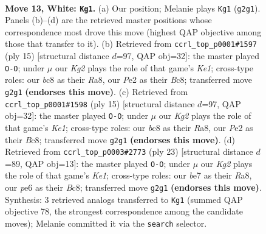 \documentclass[11pt]{article}
\begin{document}
\clearpage

\begin{figure}[p]\centering
\begin{subfigure}{0.46\textwidth}\centering
\resizebox{\linewidth}{!}{%
\newchessgame
\chessboard[
  setfen={rnbqr1k1/p3bp1p/2p1p1p1/1p1n4/3P4/3Q1BP1/PP1NPPKP/RNB2R2 w - - 0 13},
  showmover=false,
  pgfstyle=straightmove, color=movearrow, markmove={g2-g1}
]}
\caption{}
\end{subfigure}\hfill
\begin{subfigure}{0.46\textwidth}\centering
\resizebox{\linewidth}{!}{%
\newchessgame
\chessboard[
  setfen={r1bqk2r/ppp1npbp/2np2p1/8/2PNP3/2N1B1P1/PP3P1P/R2QKB1R b KQkq - 2 8},
  showmover=false,
  pgfstyle=straightmove, color=movearrow, markmove={e8-g8}
]}
\caption{}
\end{subfigure}
\\[4pt]
\begin{subfigure}{0.46\textwidth}\centering
\resizebox{\linewidth}{!}{%
\newchessgame
\chessboard[
  setfen={r1bqk2r/ppp1npbp/2np2p1/8/2PNP3/2N1B1P1/PP3P1P/R2QKB1R b KQkq - 2 8},
  showmover=false,
  pgfstyle=straightmove, color=movearrow, markmove={e8-g8}
]}
\caption{}
\end{subfigure}\hfill
\begin{subfigure}{0.46\textwidth}\centering
\resizebox{\linewidth}{!}{%
\newchessgame
\chessboard[
  setfen={r1bqk2r/1p2nppp/2pp2n1/p1b5/P2NP3/2P1B3/1P2BPPP/RN1QR1K1 b kq - 3 12},
  showmover=false,
  pgfstyle=straightmove, color=movearrow, markmove={e8-g8}
]}
\caption{}
\end{subfigure}
\caption{\textbf{Move 13, White: \texttt{Kg1}.} (a) Our position; Melanie plays \texttt{Kg1} (\texttt{g2g1}). Panels (b)--(d) are the retrieved master positions whose correspondence most drove this move (highest QAP objective among those that transfer to it). (b) Retrieved from \texttt{ccrl\_top\_p0001\#1597} (ply 15) [structural distance $d$=97, QAP obj=32]: the master played \texttt{O-O}; under $\mu$ our \emph{Kg2} plays the role of that game's \emph{Ke1}; cross-type roles: our \emph{b}c8 as their \emph{R}a8, our \emph{P}e2 as their \emph{B}c8; transferred move \texttt{g2g1} \textbf{(endorses this move)}. (c) Retrieved from \texttt{ccrl\_top\_p0001\#1598} (ply 15) [structural distance $d$=97, QAP obj=32]: the master played \texttt{O-O}; under $\mu$ our \emph{Kg2} plays the role of that game's \emph{Ke1}; cross-type roles: our \emph{b}c8 as their \emph{R}a8, our \emph{P}e2 as their \emph{B}c8; transferred move \texttt{g2g1} \textbf{(endorses this move)}. (d) Retrieved from \texttt{ccrl\_top\_p0003\#2773} (ply 23) [structural distance $d$=89, QAP obj=13]: the master played \texttt{O-O}; under $\mu$ our \emph{Kg2} plays the role of that game's \emph{Ke1}; cross-type roles: our \emph{b}e7 as their \emph{R}a8, our \emph{p}e6 as their \emph{B}c8; transferred move \texttt{g2g1} \textbf{(endorses this move)}. Synthesis: 3 retrieved analogs transferred to \texttt{Kg1} (summed QAP objective 78, the strongest correspondence among the candidate moves); Melanie committed it via the \texttt{search} selector.}
\label{fig:thought-m24}
\end{figure}
\end{document}
